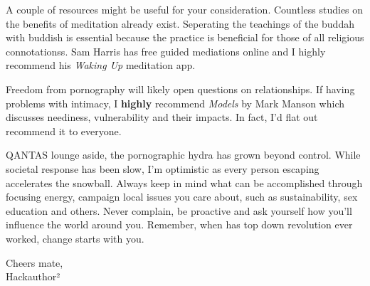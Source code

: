 \documentclass[easypeasy.tex]{subfiles}
\begin{document}
A couple of resources might be useful for your consideration. Countless studies on the benefits of meditation already exist. Seperating the teachings of the buddah with buddish is essential because the practice is beneficial for those of all religious connotationss. Sam Harris has free guided mediations online and I highly recommend his \textit{Waking Up} meditation app.

Freedom from pornography will likely open questions on relationships. If having problems with intimacy, I \textbf{highly} recommend \textit{Models} by Mark Manson which discusses neediness, vulnerability and their impacts. In fact, I'd flat out recommend it to everyone.

QANTAS lounge aside, the pornographic hydra has grown beyond control. While societal response has been slow, I'm optimistic as every person escaping accelerates the snowball. Always keep in mind what can be accomplished through focusing energy, campaign local issues you care about, such as sustainability, sex education and others. Never complain, be proactive and ask yourself how you'll influence the world around you. Remember, when has top down revolution ever worked, change starts with you.

Cheers mate, \\
Hackauthor²
\end{document}
